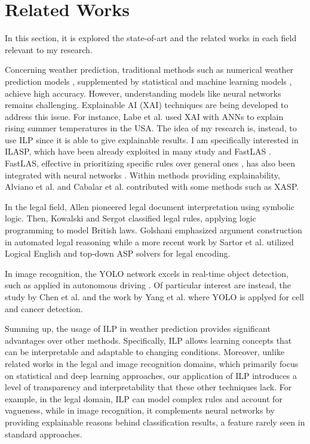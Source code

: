 \section{Related Works}
In this section, it is explored the state-of-art and the related works in each field relevant to my research.

Concerning weather prediction, traditional methods such as numerical weather prediction models \cite{Kalnay2002}, supplemented by statistical and machine learning models \cite{rasp2018deep,mcgovern2017using,weyn2019can,weyn2020improving,li2024generative}, achieve high accuracy. However, understanding models like neural networks remains challenging. Explainable AI (XAI) techniques are being developed to address this issue. For instance, Labe et al. \cite{labe2023changes} used XAI with ANNs to explain rising summer temperatures in the USA. The idea of my research is, instead, to use ILP since it is able to give explainable results. I am specifically interested in ILASP, which have been already exploited in many study \cite{law2014inductive} and FastLAS \cite{baugh2023neuro,cunnington2023symbolic}. FastLAS, effective in prioritizing specific rules over general ones \cite{policyfastlas}, has also been integrated with neural networks \cite{cunnington2023ffnsl}. Within methods providing explainability, Alviano et al. \cite{alviano2023advancements} and Cabalar et al. \cite{cabalar2014causal} contributed with some methods such as XASP.

In the legal field, Allen \cite{Allen57} pioneered legal document interpretation using symbolic logic. Then, Kowalski and Sergot \cite{DBLP:conf/ijcai/KowalskiS85} classified legal rules, applying logic programming to model British laws. Golshani \cite{DBLP:journals/ijis/Golshani91} emphasized argument construction in automated legal reasoning while a more recent work by Sartor et al. \cite{DBLP:conf/iclp/SartorDBCPK22} utilized Logical English and top-down ASP solvers for legal encoding.

In image recognition, the YOLO network \cite{redmon2016you} excels in real-time object detection, such as applied in autonomous driving \cite{huang2022rd}. Of particular interest are instead, the study by Chen et al. \cite{chen2024multi} and the work by Yang et al. \cite{yang2024research} where YOLO is applyed for cell and cancer detection.

Summing up, the usage of ILP in weather prediction provides significant advantages over other methods. Specifically, ILP allows learning concepts that can be interpretable and adaptable to changing conditions. Moreover, unlike related works in the legal and image recognition domains, which primarily focus on statistical and deep learning approaches, our application of ILP introduces a level of transparency and interpretability that these other techniques lack. For example, in the legal domain, ILP can model complex rules and account for vagueness, while in image recognition, it complements neural networks by providing explainable reasons behind classification results, a feature rarely seen in standard approaches.
